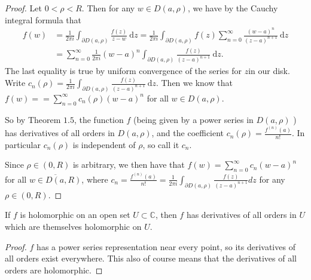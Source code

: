 \documentclass[egregdoesnotlikesansseriftitles,a4paper]{scrartcl}
\begin{document}
\begin{proof}
      Let $0<\rho <R$. Then for any $w \in D \left(a,\rho \right)$, we have by the Cauchy integral formula that 
      \begin{align*}
           f \left(w\right)&=\frac{1}{2\pi i} \int_{\partial D \left(a,\rho \right)}^{} \frac{f \left(z\right)}{z-w} \ \mathrm{d}z = \frac{1}{2\pi i} \int_{\partial D \left(a,\rho \right)}^{} f \left(z\right)\sum_{n=0}^{\infty} \frac{\left(w-a\right)^{n}}{\left(z-a\right)^{n+1}} \ \mathrm{d}z\\
           &= \sum_{n=0}^{\infty}\frac{1}{2\pi i} \left(w-a\right)^{n}\int_{\partial D \left(a,\rho \right)}^{} \frac{f \left(z\right)}{\left(z-a\right)^{n+1}} \ \mathrm{d}z.
      \end{align*}
      The last equality is true by uniform convergence of the series for $z$in our disk. Write $c_{n}\left(\rho \right)=\frac{1}{2\pi i}\int_{\partial D \left(a,\rho \right)}^{} \frac{f \left(z\right)}{\left(z-a\right)^{n+1}} \ \mathrm{d}z$. Then we know that $f \left(w\right)= =\sum_{n=0}^{\infty}c_{n}\left(\rho \right) \left(w-a\right)^{n}$ for all $w \in D \left(a,\rho \right)$.

      So by Theorem $1.5$, the function $f$ (being given by a power series in $D(a, \rho)$ ) has derivatives of all orders in $D(a, \rho)$, and the coefficient $c_{n}(\rho)=\frac{f^{(n)}(a)}{n !} .$ In particular $c_{n}(\rho)$ is independent of $\rho$, so call it $c_{n}$.

     Since $\rho \in(0, R)$ is arbitrary, we then have that $f(w)=\sum_{n=0}^{\infty} c_{n}(w-a)^{n}$ for all $\overline{w \in D(a, R)}$, where $c_{n}=\frac{f^{(n)}(a)}{n !}=\frac{1}{2 \pi i} \int_{\partial D(a, \rho)} \frac{f(z)}{(z-a)^{n+1}} d z$ for any $\rho \in(0, R)$.
\end{proof}
\begin{corollary}
      If $f$ is holomorphic on an open set $U \subset \mathbb{C}$, then $f$ has derivatives of all orders in $U$ which are themselves holomorphic on $U$. 
\end{corollary}
\begin{proof}
      $f$ has a power series representation near every point, so its derivatives of all orders exist everywhere. This also of course means that the derivatives of all orders are holomorphic.
\end{proof}
\end{document}
